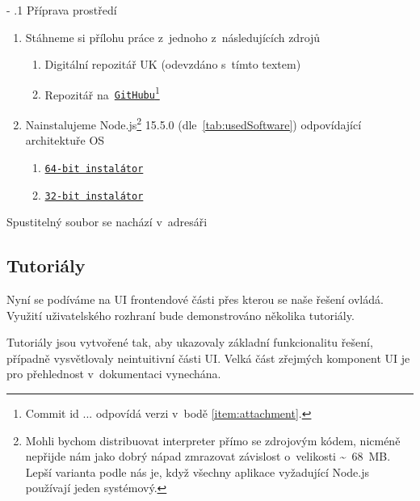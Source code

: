 \documentclass[12pt, a4paper, twoside]{article}
\makeatletter
\renewcommand\paragraph{%
	\@startsection{subparagraph}{5}{0mm}%
	{-\baselineskip}%
	{.1\baselineskip}%
	{\normalfont\normalsize\bfseries}}
\makeatother
\begin{document}
	\paragraph{Příprava prostředí}
	\begin{enumerate}[leftmargin=*, align=left]
		\item Stáhneme si přílohu práce z~jednoho z~následujících zdrojů
		\begin{enumerate}[leftmargin=*,label={\alph*)}, align=left,topsep=0pt]
			\item \label{item:attachment} Digitální repozitář UK (odevzdáno s~tímto textem)
			\item Repozitář na~\href{https://github.com/Kubikola/puppeteer-recorder}{\nolinkurl{GitHubu}}\footnote{Commit id ... odpovídá verzi v~bodě \ref{item:attachment}.} 
		\end{enumerate}
		\item Nainstalujeme Node.js\footnote{Mohli bychom distribuovat interpreter přímo se zdrojovým kódem, nicméně nepřijde nám jako dobrý nápad zmrazovat závislost o~velikosti \textasciitilde~68~MB. Lepší varianta podle nás je, když všechny aplikace vyžadující Node.js používají jeden systémový.} 15.5.0 (dle~\cref{tab:usedSoftware}) odpovídající architektuře OS
		\begin{enumerate}[leftmargin=*,label={\alph*)}, align=left,topsep=0pt]
			\item \href{https://nodejs.org/download/release/v15.5.0/node-v15.5.0-x64.msi}{\texttt{64-bit instalátor}}
			\item \href{https://nodejs.org/download/release/v15.5.0/node-v15.5.0-x86.msi}{\texttt{32-bit instalátor}}
		\end{enumerate}
	\end{enumerate}
	Spustitelný soubor se nachází v~adresáři 
	\subsection{Tutoriály}
	\label{sub_sec:usersDocs}
	Nyní se podíváme na UI frontendové části přes kterou se naše řešení ovládá. Využití uživatelského rozhraní bude demonstrováno několika tutoriály.
	
	Tutoriály jsou vytvořené tak, aby ukazovaly základní funkcionalitu řešení, případně vysvětlovaly neintuitivní části UI. Velká část zřejmých komponent UI je pro přehlednost v~dokumentaci vynechána.
\end{document}
